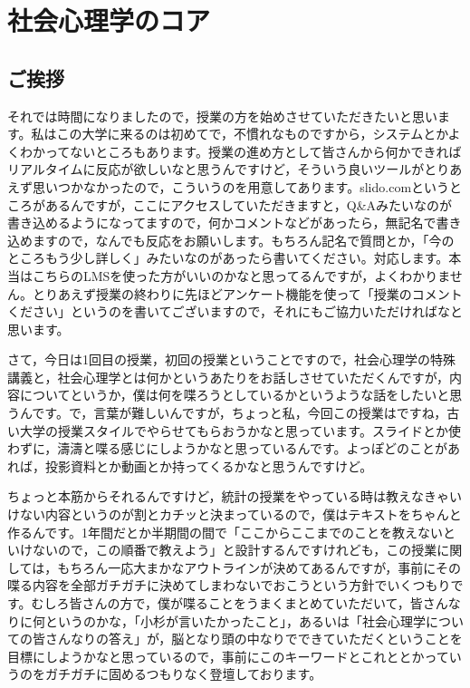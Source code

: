 \documentclass{ltjsbook}
\begin{document}
\chapter{社会心理学のコア}
\label{sp01_introduction}

\section{ご挨拶}

それでは時間になりましたので，授業の方を始めさせていただきたいと思います。私はこの大学に来るのは初めてで，不慣れなものですから，システムとかよくわかってないところもあります。授業の進め方として皆さんから何かできればリアルタイムに反応が欲しいなと思うんですけど，そういう良いツールがとりあえず思いつかなかったので，こういうのを用意してあります。slido.comというところがあるんですが，ここにアクセスしていただきますと，Q\&Aみたいなのが書き込めるようになってますので，何かコメントなどがあったら，無記名で書き込めますので，なんでも反応をお願いします。もちろん記名で質問とか，「今のところもう少し詳しく」みたいなのがあったら書いてください。対応します。本当はこちらのLMSを使った方がいいのかなと思ってるんですが，よくわかりません。とりあえず授業の終わりに先ほどアンケート機能を使って「授業のコメントください」というのを書いてございますので，それにもご協力いただければなと思います。

さて，今日は1回目の授業，初回の授業ということですので，社会心理学の特殊講義と，社会心理学とは何かというあたりをお話しさせていただくんですが，内容についてというか，僕は何を喋ろうとしているかというような話をしたいと思うんです。で，言葉が難しいんですが，ちょっと私，今回この授業はですね，古い大学の授業スタイルでやらせてもらおうかなと思っています。スライドとか使わずに，濤濤と喋る感じにしようかなと思っているんです。よっぽどのことがあれば，投影資料とか動画とか持ってくるかなと思うんですけど。

ちょっと本筋からそれるんですけど，統計の授業をやっている時は教えなきゃいけない内容というのが割とカチッと決まっているので，僕はテキストをちゃんと作るんです。1年間だとか半期間の間で「ここからここまでのことを教えないといけないので，この順番で教えよう」と設計するんですけれども，この授業に関しては，もちろん一応大まかなアウトラインが決めてあるんですが，事前にその喋る内容を全部ガチガチに決めてしまわないでおこうという方針でいくつもりです。むしろ皆さんの方で，僕が喋ることをうまくまとめていただいて，皆さんなりに何というのかな，「小杉が言いたかったこと」，あるいは「社会心理学についての皆さんなりの答え」が，脳となり頭の中なりでできていただくということを目標にしようかなと思っているので，事前にこのキーワードとこれととかっていうのをガチガチに固めるつもりなく登壇しております。
\end{document}

